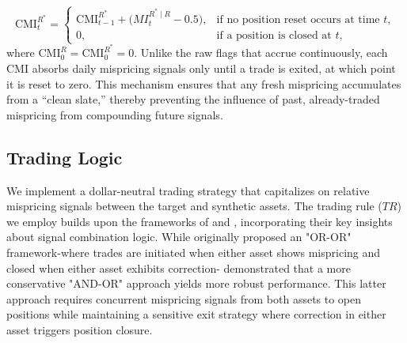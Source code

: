 $$
\mathrm{CMI}^{R^*}_{t} =
\begin{cases}
\mathrm{CMI}^{R^*}_{t-1} + \bigl(MI_t^{R^*\mid R} - 0.5\bigr), & \text{if no position reset occurs at time } t,\\
0, & \text{if a position is closed at } t,
\end{cases}
$$
where \(\mathrm{CMI}^R_{0}= \mathrm{CMI}^{R^*}_{0}=0\). 
Unlike the raw flags that accrue continuously, each CMI absorbs daily mispricing signals only until a trade is exited, at which point it is reset to zero. This mechanism ensures that any fresh mispricing accumulates from a ``clean slate,'' thereby preventing the influence of past, already-traded mispricing from compounding future signals.
%
%
%
\subsection{Trading Logic}

We implement a dollar-neutral trading strategy that capitalizes on relative mispricing signals between the target and synthetic assets. The trading rule ($TR$) we employ builds upon the frameworks of \cite{Xie2016} and \cite{Rad2016}, incorporating their key insights about signal combination logic. While \cite{Xie2016} originally proposed an "OR-OR" framework-where trades are initiated when either asset shows mispricing and closed when either asset exhibits correction-\cite{Rad2016} demonstrated that a more conservative "AND-OR" approach yields more robust performance. This latter approach requires concurrent mispricing signals from both assets to open positions while maintaining a sensitive exit strategy where correction in either asset triggers position closure.

